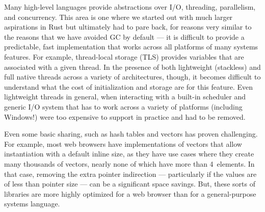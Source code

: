 Many high-level languages provide abstractions over I/O, threading, parallelism, and concurrency.
This area is one where we started out with much larger aspirations in Rust but ultimately had to pare back,
for reasons very similar to the reasons that we have avoided GC by default --- it is difficult to provide a
predictable, fast implementation that works across all platforms of many systems features.
For example, thread-local storage (TLS) provides variables that are associated with a given thread.
In the presence of both lightweight (stackless) and full native threads across a variety of architectures, though,
it becomes difficult to understand what the cost of initialization and storage are for this feature.
Even lightweight threads in general, when interacting with a built-in scheduler and generic I/O system that
has to work across a variety of platforms (including Windows!) were too expensive to support in practice and
had to be removed.

Even some basic sharing, such as hash tables and vectors has proven challenging.
For example, most web browsers have implementations of vectors that allow instantiation with a default inline size,
as they have use cases where they create many thousands of vectors, nearly none of which have more than 4~elements.
In that case, removing the extra pointer indirection --- particularly if the values are of less than pointer size ---
can be a significant space savings.
But, these sorts of libraries are more highly optimized for a web browser than for a general-purpose systems language.
